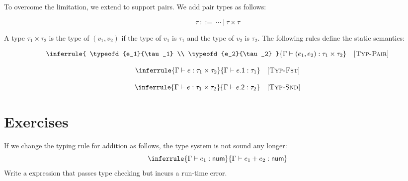To overcome the limitation, we extend \Lang to support pairs.
We add pair types as follows:

\[ \tau \ ::= \ \cdots\ | \ \tau\times\tau \]

A type $\tau_1\times\tau_2$ is the type of $(v_1,v_2)$ if the type of $v_1$ is
$\tau_1$ and the type of $v_2$ is $\tau_2$.
The following rules define the static semantics:


\vspace{-1em}

\[
  \inferrule
  { \typeofd{e_1}{\tau_1} \\
    \typeofd{e_2}{\tau_2} }
  { \typeofd{(e_1,e_2)}{\tau_1\times\tau_2} }
  \quad\textsc{[Typ-Pair]}
\]


\vspace{-1em}

\[
  \inferrule
  { \typeofd{e}{\tau_1\times\tau_2} }
  { \typeofd{e\textsf{.1}}{\tau_1} }
  \quad\textsc{[Typ-Fst]}
\]


\vspace{-1em}

\[
  \inferrule
  { \typeofd{e}{\tau_1\times\tau_2} }
  { \typeofd{e\textsf{.2}}{\tau_2} }
  \quad\textsc{[Typ-Snd]}
\]

\section{Exercises}

\begin{exercise}

If we change the typing rule for addition as follows, the type system
is not sound any longer:
\[
  \inferrule
  { \typeofd{e_1}{\tnum} }
  { \typeofd{\eadd{e_1}{e_2}}{\tnum} }
\]
Write a \Lang expression that passes type checking but incurs a run-time error.

\end{exercise}

